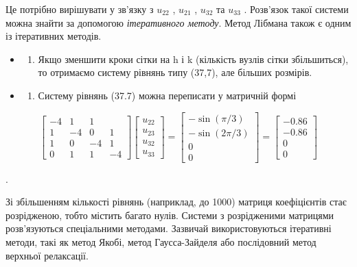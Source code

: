 \documentclass[
  ukrainian,
]{article}
\providecommand{\tightlist}{%
  \setlength{\itemsep}{0pt}\setlength{\parskip}{0pt}}
\begin{document}
Це потрібно вирішувати у зв'язку з \(u_{22}\) , \(u_{21}\) , \(u_{32}\)
та \(u_{33}\) . Розв'язок такої системи можна знайти за допомогою
\emph{ітеративного методу}. Метод Лібмана також є одним із ітеративних
методів.

\begin{itemize}
\tightlist
\item
  \begin{enumerate}
  \def\labelenumi{\arabic{enumi}.}
  \setcounter{enumi}{1}
  \tightlist
  \item
    Якщо зменшити кроки сітки на h і k (кількість вузлів сітки
    збільшиться), то отримаємо систему рівнянь типу (37,7), але більших
    розмірів.
  \end{enumerate}
\item
  \begin{enumerate}
  \def\labelenumi{\arabic{enumi}.}
  \setcounter{enumi}{2}
  \tightlist
  \item
    Систему рівнянь (37.7) можна переписати у матричній формі
  \end{enumerate}
\end{itemize}

\[
\begin{bmatrix} -4 & 1 & 1 \\ 1 & -4 & 0 & 1 \\ 1 & 0 & -4 & 1 \\ 0 & 1 & 1 & -4 \end{bmatrix}
\begin{bmatrix} u_{22} \\ u_{23} \\ u_{32} \\ u_{33} \end{bmatrix}
=
\begin{bmatrix} -\sin{(\pi/3)} \\ -\sin{(2\pi/3)} \\ 0 \\ 0 \end{bmatrix}
=
\begin{bmatrix} -0.86 \\ -0.86 \\ 0 \\ 0 \end{bmatrix}
\]

.

Зі збільшенням кількості рівнянь (наприклад, до 1000) матриця
коефіцієнтів стає розрідженою, тобто містить багато нулів. Системи з
розрідженими матрицями розв'язуються спеціальними методами. Зазвичай
використовуються ітеративні методи, такі як метод Якобі, метод
Гаусса-Зайделя або послідовний метод верхньої релаксації.
\end{document}

